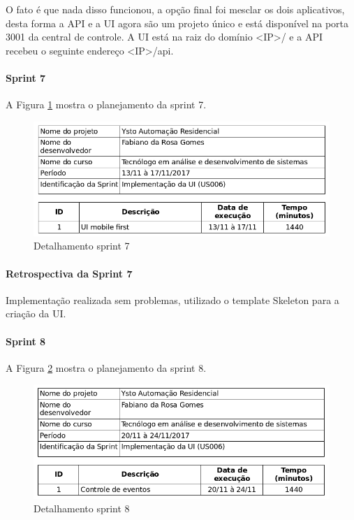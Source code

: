 O fato é que nada disso funcionou, a opção final foi mesclar os dois aplicativos, desta forma a API e a UI agora são um projeto único e está disponível na porta 3001 da central de controle. A UI está na raiz do domínio <IP>/ e a API recebeu o seguinte endereço <IP>/api.

\paragraph{Sprint 7} A Figura \ref{sprint-7} mostra o planejamento da sprint 7.

\begin{figure}[H]
\caption{\label{sprint-7} Detalhamento sprint 7}
\includegraphics[scale=0.5]{img/sprint-7.png}
\end{figure}

\paragraph{Retrospectiva da Sprint 7}
Implementação realizada sem problemas, utilizado o template Skeleton \cite{SKELETON} para a criação da UI.

\paragraph{Sprint 8} A Figura \ref{sprint-8} mostra o planejamento da sprint 8.

\begin{figure}[H]
\caption{\label{sprint-8} Detalhamento sprint 8}
\includegraphics[scale=0.5]{img/sprint-8.png}
\end{figure}


